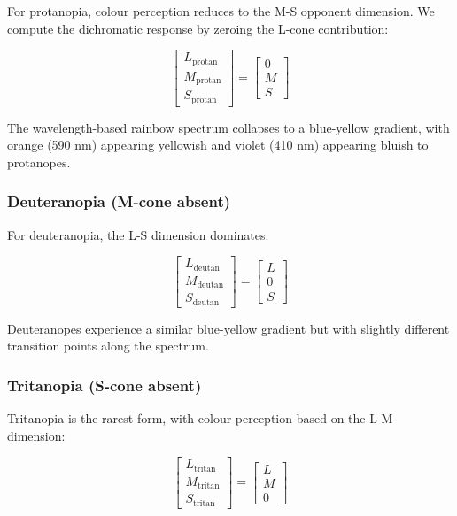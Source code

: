\documentclass[12pt,a4paper]{article}
\begin{document}
For protanopia, colour perception reduces to the M-S opponent dimension. We compute the dichromatic response by zeroing the L-cone contribution:

\begin{equation}
\begin{bmatrix} L_{\text{protan}} \\ M_{\text{protan}} \\ S_{\text{protan}} \end{bmatrix} = 
\begin{bmatrix} 0 \\ M \\ S \end{bmatrix}
\end{equation}

The wavelength-based rainbow spectrum collapses to a blue-yellow gradient, with orange (590 nm) appearing yellowish and violet (410 nm) appearing bluish to protanopes.

\subsubsection{Deuteranopia (M-cone absent)}

For deuteranopia, the L-S dimension dominates:

\begin{equation}
\begin{bmatrix} L_{\text{deutan}} \\ M_{\text{deutan}} \\ S_{\text{deutan}} \end{bmatrix} = 
\begin{bmatrix} L \\ 0 \\ S \end{bmatrix}
\end{equation}

Deuteranopes experience a similar blue-yellow gradient but with slightly different transition points along the spectrum.

\subsubsection{Tritanopia (S-cone absent)}

Tritanopia is the rarest form, with colour perception based on the L-M dimension:

\begin{equation}
\begin{bmatrix} L_{\text{tritan}} \\ M_{\text{tritan}} \\ S_{\text{tritan}} \end{bmatrix} = 
\begin{bmatrix} L \\ M \\ 0 \end{bmatrix}
\end{equation}
\end{document}
